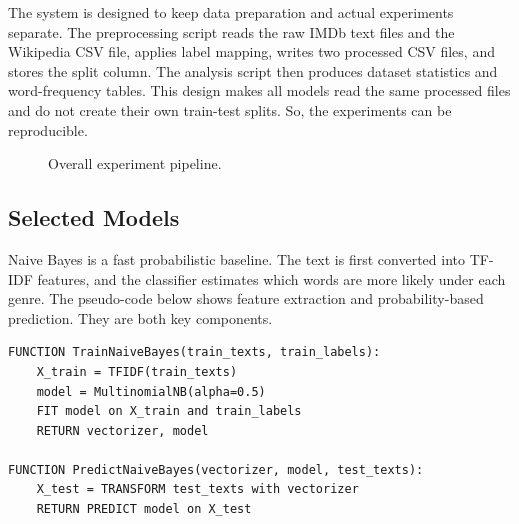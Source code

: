 \documentclass[12pt,a4paper]{article}
\begin{document}
The system is designed to keep data preparation and actual experiments separate. The preprocessing script reads the raw IMDb text files and the Wikipedia CSV file, applies label mapping, writes two processed CSV files, and stores the split column. The analysis script then produces dataset statistics and word-frequency tables. This design makes all models read the same processed files and do not create their own train-test splits. So, the experiments can be reproducible.

\begin{figure}[H]
\centering
{}
\caption{Overall experiment pipeline.}
\label{fig:pipeline}
\end{figure}

\subsection{Selected Models}
Naive Bayes is a fast probabilistic baseline. The text is first converted into TF-IDF features, and the classifier estimates which words are more likely under each genre. The pseudo-code below shows feature extraction and probability-based prediction. They are both key components.

\begin{lstlisting}[style=pseudocode,caption={Naive Bayes with TF-IDF.}]
FUNCTION TrainNaiveBayes(train_texts, train_labels):
    X_train = TFIDF(train_texts)
    model = MultinomialNB(alpha=0.5)
    FIT model on X_train and train_labels
    RETURN vectorizer, model

FUNCTION PredictNaiveBayes(vectorizer, model, test_texts):
    X_test = TRANSFORM test_texts with vectorizer
    RETURN PREDICT model on X_test
\end{lstlisting}
\end{document}
